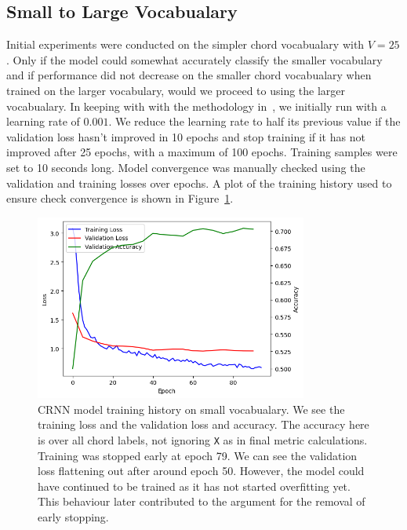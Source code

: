 \subsection{Small to Large Vocabualary}

Initial experiments were conducted on the simpler chord vocabualary with $V=25$. Only if the model could somewhat accurately classify the smaller vocabulary and if performance did not decrease on the smaller chord vocabualary when trained on the larger vocabulary, would we proceed to using the larger vocabualary. In keeping with with the methodology in~\citet{StructuredTraining}, we initially run with a learning rate of $0.001$. We reduce the learning rate to half its previous value if the validation loss hasn't improved in 10 epochs and stop training if it has not improved after 25 epochs, with a maximum of 100 epochs. Training samples were set to 10 seconds long. Model convergence was manually checked using the validation and training losses over epochs. A plot of the training history used to ensure check convergence is shown in Figure~\ref{fig:crnn_small_vocab_loss}.

\begin{figure}[h]
    \centering
    \includegraphics[width=0.8\textwidth]{figures/small_vocab_training_plot.png}
    \caption{CRNN model training history on small vocabualary. We see the training loss and the validation loss and accuracy. The accuracy here is over all chord labels, not ignoring \texttt{X} as in final metric calculations. Training was stopped early at epoch 79. We can see the validation loss flattening out after around epoch 50. However, the model could have continued to be trained as it has not started overfitting yet. This behaviour later contributed to the argument for the removal of early stopping.}\label{fig:crnn_small_vocab_loss}
\end{figure}

